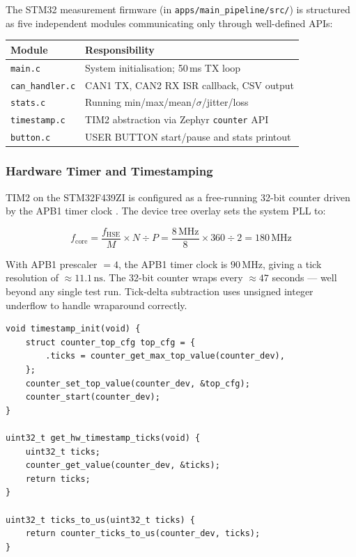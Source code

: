 \documentclass[11pt,a4paper]{article}
\begin{document}
The STM32 measurement firmware (in \texttt{apps/main\_pipeline/src/}) is structured as
five independent modules communicating only through well-defined APIs:

\begin{center}
\begin{tabular}{ll}
    \toprule
    \textbf{Module} & \textbf{Responsibility} \\
    \midrule
    \texttt{main.c}         & System initialisation; 50\,ms TX loop \\
    \texttt{can\_handler.c} & CAN1 TX, CAN2 RX ISR callback, CSV output \\
    \texttt{stats.c}        & Running min/max/mean/$\sigma$/jitter/loss \\
    \texttt{timestamp.c}    & TIM2 abstraction via Zephyr \texttt{counter} API \\
    \texttt{button.c}       & USER BUTTON start/pause and stats printout \\
    \bottomrule
\end{tabular}
\end{center}

\subsubsection{Hardware Timer and Timestamping}

TIM2 on the STM32F439ZI is configured as a free-running 32-bit counter driven by the
APB1 timer clock \cite{stm32rm}.  The device tree overlay sets the system PLL to:

\[
f_{\text{core}} = \frac{f_{\text{HSE}}}{M} \times N \div P
= \frac{8\,\text{MHz}}{8} \times 360 \div 2 = 180\,\text{MHz}
\]

With APB1 prescaler $= 4$, the APB1 timer clock is $90\,\text{MHz}$, giving a tick
resolution of $\approx 11.1\,\text{ns}$.  The 32-bit counter wraps every $\approx 47$
seconds --- well beyond any single test run.  Tick-delta subtraction uses unsigned integer
underflow to handle wraparound correctly.

\begin{lstlisting}[style=cstyle, caption={timestamp.c --- TIM2 initialisation and tick capture}]
void timestamp_init(void) {
    struct counter_top_cfg top_cfg = {
        .ticks = counter_get_max_top_value(counter_dev),
    };
    counter_set_top_value(counter_dev, &top_cfg);
    counter_start(counter_dev);
}

uint32_t get_hw_timestamp_ticks(void) {
    uint32_t ticks;
    counter_get_value(counter_dev, &ticks);
    return ticks;
}

uint32_t ticks_to_us(uint32_t ticks) {
    return counter_ticks_to_us(counter_dev, ticks);
}
\end{lstlisting}
\end{document}
